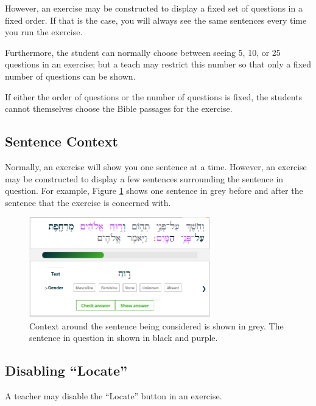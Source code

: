 \documentclass[11pt,oneside,a4paper]{memoir}
\begin{document}
However, an exercise may be constructed to display a fixed set of questions in a fixed order. If
that is the case, you will always see the same sentences every time you run the exercise.

Furthermore, the student can normally choose between seeing 5, 10, or 25 questions in an exercise;
but a teach may restrict this number so that only a fixed number of questions can be shown.

If either the order of questions or the number of questions is fixed, the students cannot themselves
choose the Bible passages for the exercise.

\subsection{Sentence Context}

Normally, an exercise will show you one sentence at a time. However, an exercise may be constructed
to display a few sentences surrounding the sentence in question. For example, Figure
\ref{fig-context} shows one sentence in grey before and after the sentence that the exercise is
concerned with.

\begin{figure}
  \begin{center}
    \includegraphics[width=0.7\textwidth]{fig-context.png}
  \end{center}
  \caption{Context around the sentence being considered is shown in grey. The sentence in question
    in shown in black and purple.}\label{fig-context}
\end{figure}


\subsection{Disabling ``Locate''}

A teacher may disable the ``Locate'' button in an exercise.
\end{document}
